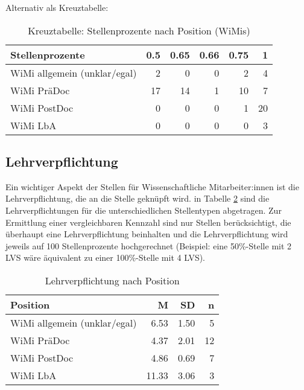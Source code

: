 \documentclass[
]{article}
\begin{document}
Alternativ als Kreuztabelle:

\begin{table}[H]

\caption{\label{tab:unnamed-chunk-2}Kreuztabelle: Stellenprozente nach Position (WiMis)}
\centering
\begin{tabular}[t]{l|r|r|r|r|r}
\hline
Stellenprozente & 0.5 & 0.65 & 0.66 & 0.75 & 1\\
\hline
WiMi allgemein (unklar/egal) & 2 & 0 & 0 & 2 & 4\\
\hline
WiMi PräDoc & 17 & 14 & 1 & 10 & 7\\
\hline
WiMi PostDoc & 0 & 0 & 0 & 1 & 20\\
\hline
WiMi LbA & 0 & 0 & 0 & 0 & 3\\
\hline
\end{tabular}
\end{table}

\hypertarget{lehrverpflichtung}{%
\subsection{Lehrverpflichtung}\label{lehrverpflichtung}}

Ein wichtiger Aspekt der Stellen für Wissenschaftliche Mitarbeiter:innen ist die Lehrverpflichtung, die an die Stelle geknüpft wird. in Tabelle \ref{tab:teachperperc} sind die Lehrverpflichtungen für die unterschiedlichen Stellentypen abgetragen. Zur Ermittlung einer vergleichbaren Kennzahl sind nur Stellen berücksichtigt, die überhaupt eine Lehrverpflichtung beinhalten und die Lehrverpflichtung wird jeweils auf 100 Stellenprozente hochgerechnet (Beispiel: eine 50\%-Stelle mit 2 LVS wäre äquivalent zu einer 100\%-Stelle mit 4 LVS).

\begin{table}[H]

\caption{\label{tab:teachperperc}Lehrverpflichtung nach Position}
\centering
\begin{tabular}[t]{l|r|r|r}
\hline
Position & M & SD & n\\
\hline
WiMi allgemein (unklar/egal) & 6.53 & 1.50 & 5\\
\hline
WiMi PräDoc & 4.37 & 2.01 & 12\\
\hline
WiMi PostDoc & 4.86 & 0.69 & 7\\
\hline
WiMi LbA & 11.33 & 3.06 & 3\\
\hline
\end{tabular}
\end{table}
\end{document}
